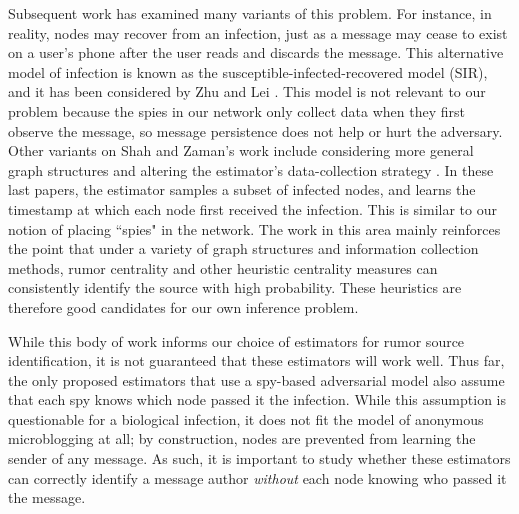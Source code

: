 Subsequent work has examined many variants of this problem. For instance, in reality, nodes may recover from an infection, just as a message may cease to exist on a user's phone after the user reads and discards the message. This alternative model of infection is known as the susceptible-infected-recovered model (SIR), and it has been considered by Zhu and Lei \cite{zhu2013information}. This model is not relevant to our problem because the spies in our network only collect data when they first observe the message, so message persistence does not help or hurt the adversary.
Other variants on Shah and Zaman's work include considering more general graph structures \cite{shah2012rumor} and altering the estimator's data-collection strategy \cite{pinto,karamchandani2013rumor,luo2013identify}.
In these last papers, the estimator samples a subset of infected nodes, and learns the timestamp at which each node first received the infection. 
This is similar to our notion of placing ``spies" in the network. 
The work in this area mainly reinforces the point that under a variety of graph structures and information collection methods, rumor centrality and other heuristic centrality measures can consistently identify the source with high probability. 
These heuristics are therefore good candidates for our own inference problem. 

While this body of work informs our choice of estimators for rumor source identification, it is not guaranteed that these estimators will work well. 
Thus far, the only proposed estimators that use a spy-based adversarial model also assume that each spy knows which node passed it the infection.
While this assumption is questionable for a biological infection, it does not fit the model of anonymous microblogging at all; by construction, nodes are prevented from learning the sender of any message.
As such, it is important to study whether these estimators can correctly identify a message author \emph{without} each node knowing who passed it the message.

